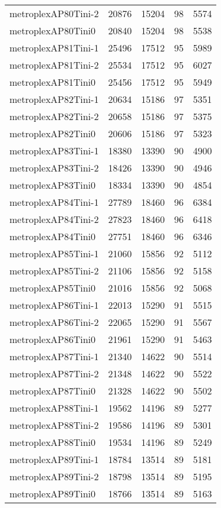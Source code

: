 \begin{longtable}{lrrrr}
metroplexAP80Tini-2 & 20876 & 15204 & 98 & 5574 \\
metroplexAP80Tini0 & 20840 & 15204 & 98 & 5538 \\
metroplexAP81Tini-1 & 25496 & 17512 & 95 & 5989 \\
metroplexAP81Tini-2 & 25534 & 17512 & 95 & 6027 \\
metroplexAP81Tini0 & 25456 & 17512 & 95 & 5949 \\
metroplexAP82Tini-1 & 20634 & 15186 & 97 & 5351 \\
metroplexAP82Tini-2 & 20658 & 15186 & 97 & 5375 \\
metroplexAP82Tini0 & 20606 & 15186 & 97 & 5323 \\
metroplexAP83Tini-1 & 18380 & 13390 & 90 & 4900 \\
metroplexAP83Tini-2 & 18426 & 13390 & 90 & 4946 \\
metroplexAP83Tini0 & 18334 & 13390 & 90 & 4854 \\
metroplexAP84Tini-1 & 27789 & 18460 & 96 & 6384 \\
metroplexAP84Tini-2 & 27823 & 18460 & 96 & 6418 \\
metroplexAP84Tini0 & 27751 & 18460 & 96 & 6346 \\
metroplexAP85Tini-1 & 21060 & 15856 & 92 & 5112 \\
metroplexAP85Tini-2 & 21106 & 15856 & 92 & 5158 \\
metroplexAP85Tini0 & 21016 & 15856 & 92 & 5068 \\
metroplexAP86Tini-1 & 22013 & 15290 & 91 & 5515 \\
metroplexAP86Tini-2 & 22065 & 15290 & 91 & 5567 \\
metroplexAP86Tini0 & 21961 & 15290 & 91 & 5463 \\
metroplexAP87Tini-1 & 21340 & 14622 & 90 & 5514 \\
metroplexAP87Tini-2 & 21348 & 14622 & 90 & 5522 \\
metroplexAP87Tini0 & 21328 & 14622 & 90 & 5502 \\
metroplexAP88Tini-1 & 19562 & 14196 & 89 & 5277 \\
metroplexAP88Tini-2 & 19586 & 14196 & 89 & 5301 \\
metroplexAP88Tini0 & 19534 & 14196 & 89 & 5249 \\
metroplexAP89Tini-1 & 18784 & 13514 & 89 & 5181 \\
metroplexAP89Tini-2 & 18798 & 13514 & 89 & 5195 \\
metroplexAP89Tini0 & 18766 & 13514 & 89 & 5163 \\

\end{longtable}
